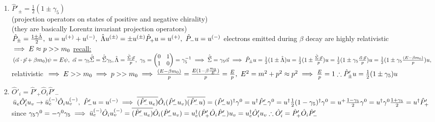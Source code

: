 \documentclass[12pt]{amsart}
\begin{document}
\begin{enumerate}
\item \underline{$\hat{P}'_{\pm} = \frac{1}{2} ( 1 \pm \gamma_5)$}\\
(projection operators on states of positive and negative chirality)\\
(they are basically Lorentz invariant projection operators)\\
$\hat{P}_{\pm} = \frac{1 \pm \hat{\Lambda}}{2},\,\, u = u^{(+)} + u^{(-)},\,\, \hat{\Lambda} u^{( \pm)} = \pm u^{(\pm)}\\
\hat{P}_+ u = u^{(+)},\,\, \hat{P}_- u = u^{(-)}\\$
electrons emitted during $\beta$ decay are highly relativistic $\implies E \approx p>> m_0\\$
\underline{recall:} $( \vec{\alpha} \cdot \vec{p} + \beta m_0) \psi = E \psi,\,\, \vec{\alpha} = \gamma_5 \hat{\vec{\Sigma}} = \hat{\vec{\Sigma}} \gamma_5,\\
\hat{\Lambda} = \frac{\hat{\vec{\Sigma}} \cdot \vec{p}}{p},\,\, \gamma_5 = \begin{pmatrix} 0 & 1 \\ 1 & 0 \end{pmatrix} = \gamma_5^{-1} \implies \hat{\vec{\Sigma}} = \gamma_5 \vec{\alpha}\\
\implies \hat{P}_{\pm} u = \frac{1}{2} ( 1 \pm \hat{\Lambda}) u = \frac{1}{2}(1 \pm \frac{\hat{\vec{\Sigma}} \cdot \vec{p}}{p}) u = \frac{1}{2} (1 \pm \gamma_5 \frac{\vec{\alpha} \cdot \vec{p}}{p}) u\\
= \frac{1}{2} (1 \pm \gamma_5 \frac{(E- \beta m_0)}{p}) u,\,\,$ relativistic $\implies E>> m_0 \implies p>> m_0\\
\implies \frac{(E- \beta m_0)}{p} = \frac{E(1- \beta \frac{m_0}{E})}{p} = \frac{E}{p},\,\, E^2 = m^2 + p^2 \approx p^2\\
\implies \frac{E}{p} =1\\
\therefore \hat{P}'_{\pm} u = \frac{1}{2} (1 \pm \gamma_5) u\\$


\hdashrule[0.5ex][c]{\linewidth}{0.5pt}{1.5mm}


\item \underline{$\hat{O}'_i = \hat{P}'_+ \hat{O}_i \hat{P}'_-$}\\
$\bar{u}_e \hat{O}'_i u_v \rightarrow \bar{u}_e^{(-)} \hat{O}_i u_v^{(-)},\,\, \hat{P}'_- u = u^{(-)}\\
\implies \overline{(\hat{P}'_- u_e)} \hat{O}_i (\hat{P}'_- u_v)\\
\overline{(\hat{P}'_- u)} = ( \hat{P}'_- u)^{\dagger} \gamma^0 = u^{\dagger} \hat{P}'_- \gamma^0 = u^{\dagger} \frac{1}{2}(1- \gamma_5)^{\dagger} \gamma^0\\
= u^+ \frac{1- \gamma_5}{2} \gamma^0 = u^{\dagger} \gamma^0 \frac{1 + \gamma_5}{2} = u^{\dagger} \hat{P}'_+\\$
since $\gamma_5 \gamma^0 = - \gamma^0 \gamma_5\\
\implies \bar{u}_e^{(-)} \hat{O}_i u^{(-)}_v = \overline{(\hat{P}'_- u_e)} \hat{O}_i ( \hat{P}'_- u_v) = u^{\dagger}_e (\hat{P}'_+ \hat{O}_i \hat{P}'_-) u_v = u_e^{\dagger} \hat{O}'_i u_v\\
\therefore \hat{O}'_i = \hat{P}'_+ \hat{O}_i \hat{P}'_-\\$



\end{enumerate}
\end{document}
